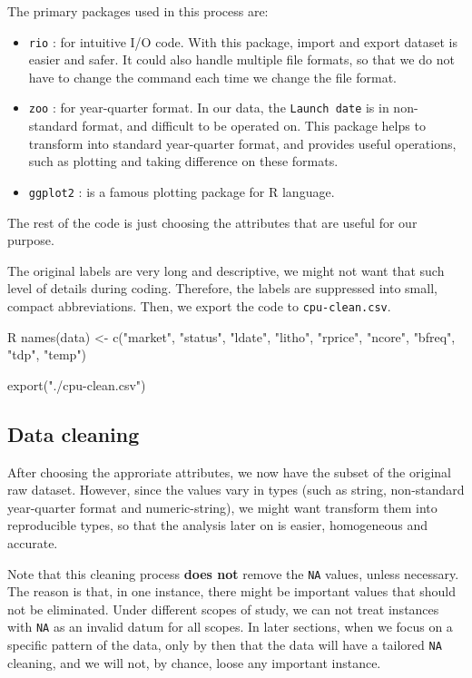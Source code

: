 The primary packages used in this process are:

\begin{itemize}
    \item \verb|rio| : for intuitive I/O code.
    With this package, import and export dataset is easier and safer. It could 
    also handle multiple file formats, so that we do not have to
    change the command each time we change the file format.

    \item \verb|zoo| : for year-quarter format.
    In our data, the \verb|Launch date| is in non-standard format, and difficult to be operated on. This package helps to transform
    into standard year-quarter format, and provides useful operations, such as plotting and taking difference on these formats.

    \item \verb|ggplot2| : is a famous plotting package for R language.
\end{itemize}

The rest of the code is just choosing the attributes that are useful for our purpose.

The original labels are very long and descriptive, we might not want that such level of details during coding. Therefore, the labels are suppressed
into small, compact abbreviations. Then, we export the code to \verb|cpu-clean.csv|.

\begin{code}{R}
names(data) <- c("market", "status", "ldate", "litho", 
    "rprice", "ncore", "bfreq", "tdp", 
    "temp")

export("./cpu-clean.csv")
\end{code}









\subsection{Data cleaning}
\label{subsection:data_cleaning}

After choosing the approriate attributes, we now have the subset of the original raw dataset. 
However, since the values vary in types (such as string, non-standard year-quarter format and numeric-string),
we might want transform them into reproducible types, so that the analysis later on is easier, homogeneous and accurate.

Note that this cleaning process \textbf{does not} remove the \texttt{NA} values, unless necessary. The reason is that, 
in one instance, there might be important values that should not be eliminated. Under different scopes of study, we can not treat 
instances with \texttt{NA} as an invalid datum for all scopes. In later sections, when we focus on a specific pattern of the data, only by then
that the data will have a tailored \texttt{NA} cleaning, and we will not, by chance, loose any important instance.

